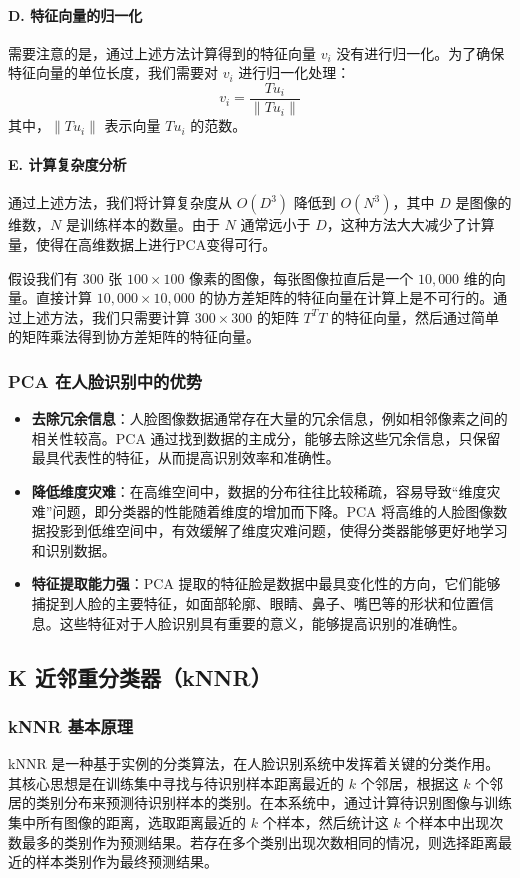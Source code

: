 \documentclass{article}
\begin{document}
\paragraph{D. 特征向量的归一化}
需要注意的是，通过上述方法计算得到的特征向量 \( v_i \) 没有进行归一化。为了确保特征向量的单位长度，我们需要对 \( v_i \) 进行归一化处理：
\[
v_i = \frac{T u_i}{\|T u_i\|}
\]
其中，\( \|T u_i\| \) 表示向量 \( T u_i \) 的范数。

\paragraph{E. 计算复杂度分析}
通过上述方法，我们将计算复杂度从 \( O(D^3) \) 降低到 \( O(N^3) \)，其中 \( D \) 是图像的维数，\( N \) 是训练样本的数量。由于 \( N \) 通常远小于 \( D \)，这种方法大大减少了计算量，使得在高维数据上进行PCA变得可行。

假设我们有 300 张 $100 \times 100$ 像素的图像，每张图像拉直后是一个 $10,000$ 维的向量。直接计算 $10,000 \times 10,000$ 的协方差矩阵的特征向量在计算上是不可行的。通过上述方法，我们只需要计算 $300 \times 300$ 的矩阵 $T^T T$ 的特征向量，然后通过简单的矩阵乘法得到协方差矩阵的特征向量。

\subsubsection{PCA 在人脸识别中的优势}
\begin{itemize}
    \item \textbf{去除冗余信息}：人脸图像数据通常存在大量的冗余信息，例如相邻像素之间的相关性较高。PCA 通过找到数据的主成分，能够去除这些冗余信息，只保留最具代表性的特征，从而提高识别效率和准确性。
    \item \textbf{降低维度灾难}：在高维空间中，数据的分布往往比较稀疏，容易导致“维度灾难”问题，即分类器的性能随着维度的增加而下降。PCA 将高维的人脸图像数据投影到低维空间中，有效缓解了维度灾难问题，使得分类器能够更好地学习和识别数据。
    \item \textbf{特征提取能力强}：PCA 提取的特征脸是数据中最具变化性的方向，它们能够捕捉到人脸的主要特征，如面部轮廓、眼睛、鼻子、嘴巴等的形状和位置信息。这些特征对于人脸识别具有重要的意义，能够提高识别的准确性。
\end{itemize}

\subsection{K 近邻重分类器（kNNR）}

\subsubsection{kNNR 基本原理}
kNNR 是一种基于实例的分类算法，在人脸识别系统中发挥着关键的分类作用。其核心思想是在训练集中寻找与待识别样本距离最近的 $k$ 个邻居，根据这 $k$ 个邻居的类别分布来预测待识别样本的类别。在本系统中，通过计算待识别图像与训练集中所有图像的距离，选取距离最近的 $k$ 个样本，然后统计这 $k$ 个样本中出现次数最多的类别作为预测结果。若存在多个类别出现次数相同的情况，则选择距离最近的样本类别作为最终预测结果。
\end{document}
